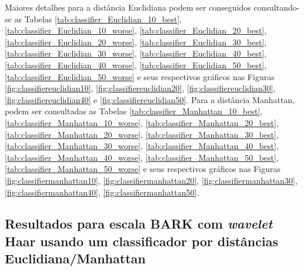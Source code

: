 		\par Maiores detalhes para a distância Euclidiana podem ser conseguidos consultando-se as Tabelas \ref{tab:classifier_Euclidian_10_best}, \ref{tab:classifier_Euclidian_10_worse},
		\ref{tab:classifier_Euclidian_20_best}, \ref{tab:classifier_Euclidian_20_worse}, 
		\ref{tab:classifier_Euclidian_30_best}, \ref{tab:classifier_Euclidian_30_worse}, 
		\ref{tab:classifier_Euclidian_40_best}, \ref{tab:classifier_Euclidian_40_worse}, 
		\ref{tab:classifier_Euclidian_50_best}, \ref{tab:classifier_Euclidian_50_worse}
		e seus respectivos gráficos nas Figuras \ref{fig:classifiereuclidian10}, \ref{fig:classifiereuclidian20}, \ref{fig:classifiereuclidian30}, \ref{fig:classifiereuclidian40} e \ref{fig:classifiereuclidian50}. Para a distância Manhattan, podem ser consultadas as Tabelas 	\ref{tab:classifier_Manhattan_10_best}, \ref{tab:classifier_Manhattan_10_worse}, 
		\ref{tab:classifier_Manhattan_20_best}, \ref{tab:classifier_Manhattan_20_worse}, 
		\ref{tab:classifier_Manhattan_30_best}, \ref{tab:classifier_Manhattan_30_worse}, 
		\ref{tab:classifier_Manhattan_40_best}, \ref{tab:classifier_Manhattan_40_worse}, 
		\ref{tab:classifier_Manhattan_50_best}, \ref{tab:classifier_Manhattan_50_worse} 
		e seus respectivos gráficos nas Figuras		 
		\ref{fig:classifiermanhattan10}, \ref{fig:classifiermanhattan20}, 	 \ref{fig:classifiermanhattan30}, \ref{fig:classifiermanhattan40},  \ref{fig:classifiermanhattan50}.
		
		
		
		\subsection{Resultados para escala BARK com \textit{wavelet} Haar usando um classificador por distâncias Euclidiana/Manhattan}

			
			
			
			
			
			
			
			
			
			

